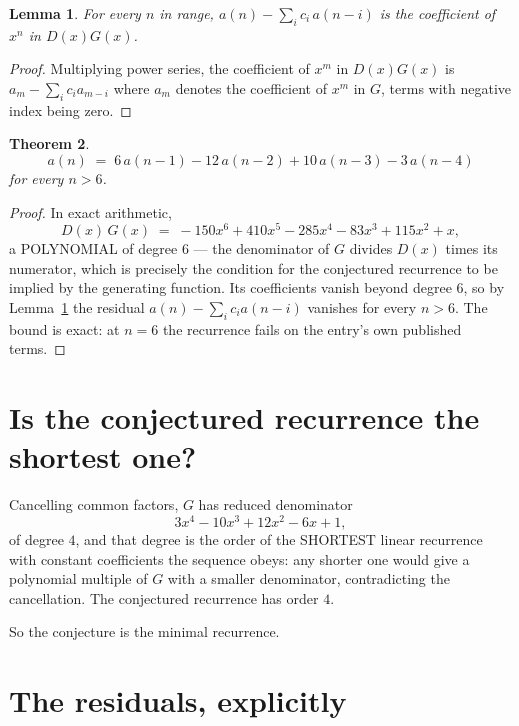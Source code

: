 \documentclass[11pt,a4paper]{article}
\theoremstyle{plain}
\newtheorem{theorem}{Theorem}
\newtheorem{lemma}[theorem]{Lemma}
\theoremstyle{definition}
\begin{document}
\begin{lemma}\label{lem:key}
For every $n$ in range, $a(n)-\sum_i c_i\,a(n-i)$ is the coefficient of $x^{n}$ in
$D(x)G(x)$.
\end{lemma}

\begin{proof}
Multiplying power series, the coefficient of $x^{m}$ in $D(x)G(x)$ is
$a_m-\sum_i c_i a_{m-i}$ where $a_m$ denotes the coefficient of $x^{m}$ in $G$, terms with
negative index being zero.
\end{proof}

\begin{theorem}
\[
a(n)\;=\;6\,a(n-1) - 12\,a(n-2) + 10\,a(n-3) - 3\,a(n-4)
\]
for every $n>6$.
\end{theorem}

\begin{proof}
In exact arithmetic,
\[
D(x)\,G(x)\;=\;- 150 x^{6} + 410 x^{5} - 285 x^{4} - 83 x^{3} + 115 x^{2} + x,
\]
a POLYNOMIAL of degree $6$ --- the denominator of $G$ divides $D(x)$ times its numerator,
which is precisely the condition for the conjectured recurrence to be implied by the
generating function. Its coefficients vanish beyond degree $6$, so by
Lemma~\ref{lem:key} the residual $a(n)-\sum_ic_ia(n-i)$ vanishes for every
$n>6$. The bound is exact: at $n=6$ the recurrence fails on the entry's own published terms.
\end{proof}

\section{Is the conjectured recurrence the shortest one?}

Cancelling common factors, $G$ has reduced denominator
\[
3 x^{4} - 10 x^{3} + 12 x^{2} - 6 x + 1,
\]
of degree $4$, and that degree is the order of the SHORTEST linear recurrence with
constant coefficients the sequence obeys: any shorter one would give a polynomial multiple of
$G$ with a smaller denominator, contradicting the cancellation. The conjectured recurrence has
order $4$.

So the conjecture is the minimal recurrence.

\section{The residuals, explicitly}
\end{document}
